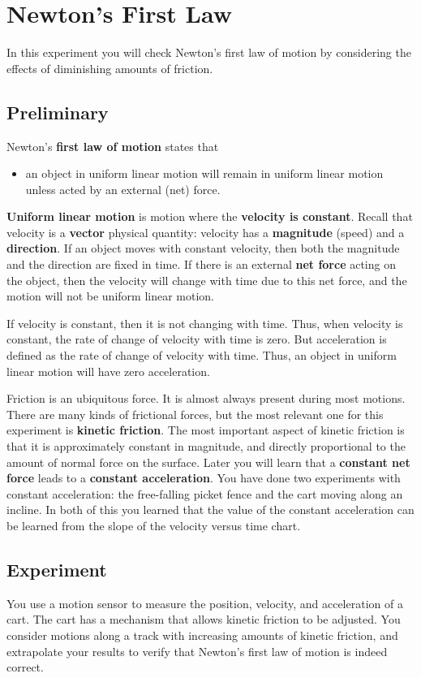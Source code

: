 \setcounter{chapter}{2}
\chapter{Newton's First Law}
%
In this experiment you will check Newton's first law of motion by considering the effects of diminishing amounts of friction.
%
\section{Preliminary}
%
Newton's \textbf{first law of motion} states that
\begin{itemize}
    \item an object in uniform linear motion will remain in uniform linear motion unless acted by an external (net) force.
\end{itemize}
\textbf{Uniform linear motion} is motion where the \textbf{velocity is constant}. Recall that velocity is a \textbf{vector} physical quantity: velocity has a \textbf{magnitude} (speed) and a \textbf{direction}. If an object moves with constant velocity, then both the magnitude and the direction are fixed in time. If there is an external \textbf{net force} acting on the object, then the velocity will change with time due to this net force, and the motion will not be uniform linear motion.

If velocity is constant, then it is not changing with time. Thus, when velocity is constant, the rate of change of velocity with time is zero. But acceleration is defined as the rate of change of velocity with time. Thus, an object in uniform linear motion will have zero acceleration.

Friction is an ubiquitous force. It is almost always present during most motions. There are many kinds of frictional forces, but the most relevant one for this experiment is \textbf{kinetic friction}. The most important aspect of kinetic friction is that it is approximately constant in magnitude, and directly proportional to the amount of normal force on the surface. Later you will learn that a \textbf{constant net force} leads to a \textbf{constant acceleration}. You have done two experiments with constant acceleration: the free-falling picket fence and the cart moving along an incline. In both of this you learned that the value of the constant acceleration can be learned from the slope of the velocity versus time chart.
%
\section{Experiment}
%
You use a motion sensor to measure the position, velocity, and acceleration of a cart. The cart has a mechanism that allows kinetic friction to be adjusted. You consider motions along a track with increasing amounts of kinetic friction, and extrapolate your results to verify that Newton's first law of motion is indeed correct.
%
